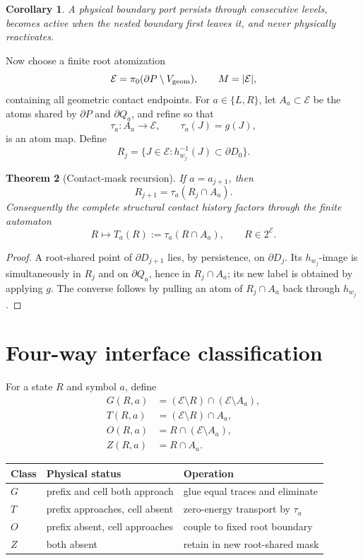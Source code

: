 \documentclass[11pt]{article}
\newtheorem{theorem}{Theorem}[section]
\newtheorem{corollary}[theorem]{Corollary}
\theoremstyle{definition}
\theoremstyle{remark}
\newcommand{\cE}{\mathcal E}
\begin{document}
\begin{corollary}
A physical boundary port persists through consecutive levels, becomes active
when the nested boundary first leaves it, and never physically reactivates.
\end{corollary}

Now choose a finite root atomization
\[
 \cE=\pi_0(\partial P\setminus V_{\rm geom}),\qquad M=|\cE|,
\]
containing all geometric contact endpoints.  For $a\in\{L,R\}$, let
$A_a\subset\cE$ be the atoms shared by $\partial P$ and $\partial Q_a$, and
refine so that
\[
 \tau_a:A_a\to\cE,\qquad \tau_a(J)=g(J),
 \tag{4.1}
\]
is an atom map.  Define
\[
 R_j=\{J\in\cE:h_{w_j}^{-1}(J)\subset\partial D_0\}.
 \tag{4.2}
\]

\begin{theorem}[Contact-mask recursion]
If $a=a_{j+1}$, then
\[
 \boxed{R_{j+1}=\tau_a(R_j\cap A_a).}
 \tag{4.3}
\]
Consequently the complete structural contact history factors through the
finite automaton
\[
 R\mapsto T_a(R):=\tau_a(R\cap A_a),
 \qquad R\in2^{\cE}.
\]
\end{theorem}

\begin{proof}
A root-shared point of $\partial D_{j+1}$ lies, by persistence, on
$\partial D_j$.  Its $h_{w_j}$-image is simultaneously in $R_j$ and on
$\partial Q_a$, hence in $R_j\cap A_a$; its new label is obtained by applying
$g$.  The converse follows by pulling an atom of $R_j\cap A_a$ back through
$h_{w_j}$.
\end{proof}

\section{Four-way interface classification}
For a state $R$ and symbol $a$, define
\[
\begin{aligned}
 G(R,a)&=(\cE\setminus R)\cap(\cE\setminus A_a),\\
 T(R,a)&=(\cE\setminus R)\cap A_a,\\
 O(R,a)&=R\cap(\cE\setminus A_a),\\
 Z(R,a)&=R\cap A_a.
\end{aligned}
\tag{5.1}
\]

\begin{center}
\begin{tabular}{lll}
\toprule
Class & Physical status & Operation \\
\midrule
$G$ & prefix and cell both approach & glue equal traces and eliminate \\
$T$ & prefix approaches, cell absent & zero-energy transport by $\tau_a$ \\
$O$ & prefix absent, cell approaches & couple to fixed root boundary \\
$Z$ & both absent & retain in new root-shared mask \\
\bottomrule
\end{tabular}
\end{center}
\end{document}
